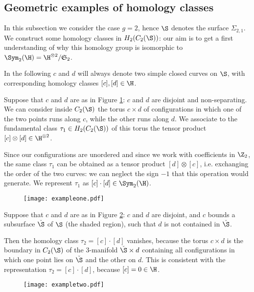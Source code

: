 \subsection{Geometric examples of homology classes}

In this subsection we consider the case $g=2$, hence $\S$ denotes the surface $\Sigma_{2,1}$.
We construct some homology classes in $H_2(C_2(\S))$: our aim is to get a first understanding
of why this homology group is isomorphic to $\Sym_2(\H)=\H^{\otimes 2}/\mathfrak{S}_2$.

In the following $c$ and $d$ will always denote two simple closed curves on $\S$, with corresponding homology classes $[c],[d]\in\H$.
\begin{ex}
 \label{ex:one}
Suppose that $c$ and $d$ are as in Figure \ref{fig:exampleone}: $c$ and $d$ are disjoint and non-separating.
We can consider inside $C_2(\S)$
the torus $c\times d$ of configurations in which one of the two points runs along $c$, while the other runs
along $d$. We associate to the fundamental class $\tau_1\in H_2(C_2(\S))$ of this torus the tensor product $[c]\otimes[d]\in\H^{\otimes 2}$.

Since our configurations are unordered and since we work with coefficients in $\Z_2$, the same
class $\tau_1$ can be obtained as a tensor product $[d]\otimes[c]$, i.e. exchanging the order of the two
curves: we can neglect the sign $-1$ that this operation would generate. We represent $\tau_1$ as $[c]\cdot[d]\in\Sym_2(\H)$.
\end{ex}
\begin{figure}[h]\centering
 \texttt{[image: exampleone.pdf]}
 \caption{}
\label{fig:exampleone}
\end{figure}

\begin{ex}
 \label{ex:two}
Suppose that $c$ and $d$ are as in Figure \ref{fig:exampletwo}:
$c$ and $d$ are disjoint, and
 $c$ bounds a subsurface $\check{\S}$ of $\S$ (the shaded region), such that $d$ is not contained in $\check{\S}$.
 
 Then the homology class $\tau_2=[c]\cdot[d]$ vanishes, because the torus $c\times d$ is the boundary in $C_2(\S)$
 of the 3-manifold $\check{\S}\times d$ containing all configurations in which one point lies on $\check{\S}$ and
 the other on $d$. This is consistent with the representation $\tau_2=[c]\cdot[d]$, because $[c]=0\in \H$.
\end{ex}
\begin{figure}[h]\centering
 \texttt{[image: exampletwo.pdf]}
 \caption{}
\label{fig:exampletwo}
\end{figure}

